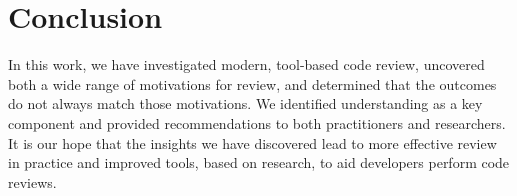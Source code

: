 
\section{Conclusion} \label{sec:conclusion}


In this work, we have investigated modern, tool-based code review, uncovered both a wide range of motivations for review, and determined that the outcomes do not always match those motivations. We identified understanding as a key component and provided recommendations to both practitioners and researchers. It is our hope that the insights we have discovered lead to more effective review in practice and improved tools, based on research, to aid developers perform code reviews.